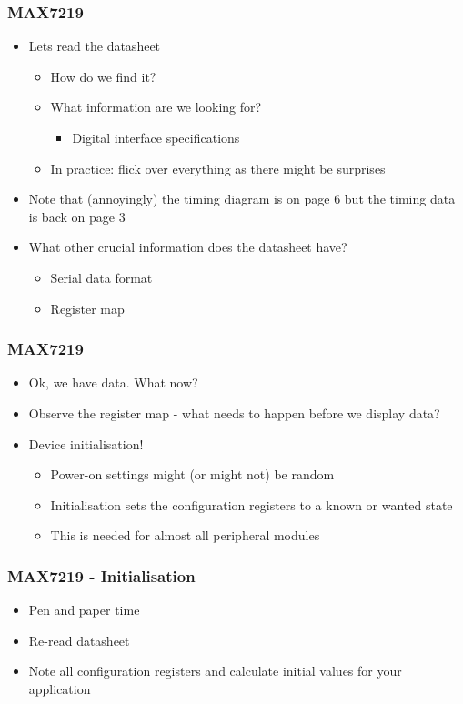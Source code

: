 \documentclass[14pt]{beamer}
\begin{document}
\begin{frame}[fragile]
\frametitle{MAX7219}
\begin{itemize}
\item Lets read the datasheet
\begin{itemize}
\item How do we find it?
\item What information are we looking for?
\pause
	\begin{itemize}
		\item Digital interface specifications
	\end{itemize}
\item In practice: flick over everything as there might be surprises
\end{itemize}
\pause
\item Note that (annoyingly) the timing diagram is on page 6 but the timing data is back on page 3
\item What other crucial information does the datasheet have?
\pause
\begin{itemize}
\item Serial data format
\item Register map
\end{itemize}
\end{itemize}
\end{frame}

\begin{frame}[fragile]
\frametitle{MAX7219}
\begin{itemize}
\item Ok, we have data. What now?
\pause
\item Observe the register map - what needs to happen before we display data?
\pause
\item Device initialisation!
\begin{itemize}
\item Power-on settings might (or might not) be random
\item Initialisation sets the configuration registers to a known or wanted state
\item This is needed for almost all peripheral modules
\end{itemize}
\end{itemize}
\end{frame}

\begin{frame}[fragile]
\frametitle{MAX7219 - Initialisation}
\begin{itemize}
\item Pen and paper time
\item Re-read datasheet
\item Note all configuration registers and calculate initial values for your application
\end{itemize}
\end{frame}
\end{document}
